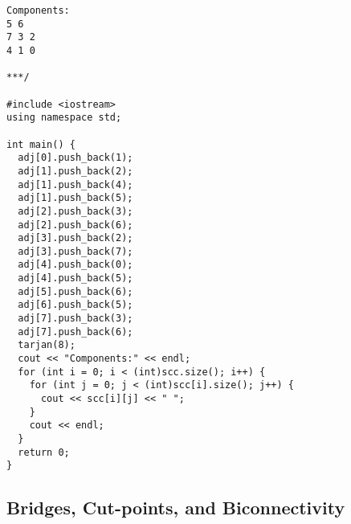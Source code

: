 \begin{lstlisting}
Components:
5 6
7 3 2
4 1 0

***/

#include <iostream>
using namespace std;

int main() {
  adj[0].push_back(1);
  adj[1].push_back(2);
  adj[1].push_back(4);
  adj[1].push_back(5);
  adj[2].push_back(3);
  adj[2].push_back(6);
  adj[3].push_back(2);
  adj[3].push_back(7);
  adj[4].push_back(0);
  adj[4].push_back(5);
  adj[5].push_back(6);
  adj[6].push_back(5);
  adj[7].push_back(3);
  adj[7].push_back(6);
  tarjan(8);
  cout << "Components:" << endl;
  for (int i = 0; i < (int)scc.size(); i++) {
    for (int j = 0; j < (int)scc[i].size(); j++) {
      cout << scc[i][j] << " ";
    }
    cout << endl;
  }
  return 0;
}
\end{lstlisting}
\subsection{Bridges, Cut-points, and Biconnectivity}
